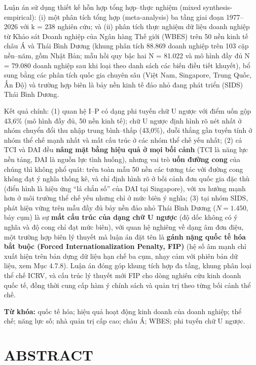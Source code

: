 \documentclass[
  a4paper,
  13pt]{extreport}
\begin{document}
Luận án sử dụng thiết kế hỗn hợp tổng hợp--thực nghiệm (mixed
synthesis-empirical): (i) một phân tích tổng hợp (meta-analysis) ba tầng
giai đoạn 1977--2026 với k = 238 nghiên cứu; và (ii) phân tích thực
nghiệm dữ liệu doanh nghiệp từ Khảo sát Doanh nghiệp của Ngân hàng Thế
giới (WBES) trên 50 nền kinh tế châu Á và Thái Bình Dương (khung phân
tích 88.869 doanh nghiệp trên 103 cặp nền--năm, gồm Nhật Bản; mẫu hồi
quy bậc hai N = 81.022 và mô hình đầy đủ N = 79.080 doanh nghiệp sau khi
loại theo danh sách các biến điều tiết khuyết), bổ sung bằng các phân
tích quốc gia chuyên sâu (Việt Nam, Singapore, Trung Quốc, Ấn Độ) và
trường hợp biên là bảy nền kinh tế đảo nhỏ đang phát triển (SIDS) Thái
Bình Dương.

Kết quả chính: (1) quan hệ I--P có dạng phi tuyến chữ U ngược với điểm
uốn gộp 43,6\% (mô hình đầy đủ, 50 nền kinh tế); chữ U ngược định hình
rõ nét nhất ở nhóm chuyển đổi thu nhập trung bình--thấp (43,0\%), duỗi
thẳng gần tuyến tính ở nhóm thể chế mạnh nhất và mất cấu trúc ở các nhóm
thể chế yếu nhất; (2) cả TCI và DAI đều \textbf{nâng mặt bằng hiệu quả ở
mọi bối cảnh} (TCI là năng lực nền tảng, DAI là nguồn lực tình huống),
nhưng vai trò \textbf{uốn đường cong} của chúng thì không phổ quát: trên
toàn mẫu 50 nền các tương tác với đường cong không đạt ý nghĩa thống kê,
và chỉ định hình rõ ở bối cảnh đơn quốc gia đặc thù (điển hình là hiệu
ứng ``lá chắn số'' của DAI tại Singapore), với xu hướng mạnh hơn ở môi
trường thể chế yếu nhưng chỉ ở mức biên ý nghĩa; (3) tại nhóm SIDS, phát
hiện vững trên mẫu đầy đủ bảy nền đảo nhỏ Thái Bình Dương
(\(N = 1.450\), bảy cụm) là sự \textbf{mất cấu trúc của dạng chữ U
ngược} (độ dốc không có ý nghĩa và độ cong chỉ đạt mức biên), với quan
hệ nghiêng về dạng âm đơn điệu, một trường hợp biên lý thuyết mà luận án
đặt tên là \textbf{gánh nặng quốc tế hóa bắt buộc (Forced
Internationalization Penalty, FIP)} (hệ số âm mạnh chỉ xuất hiện trên
bản dựng dữ liệu hạn chế ba cụm, nhạy cảm với phiên bản dữ liệu, xem Mục
4.7.8). Luận án đóng góp khung tích hợp đa tầng, khung phân loại thể chế
ICRV, và cấu trúc lý thuyết mới FIP cho dòng nghiên cứu kinh doanh quốc
tế, đồng thời cung cấp hàm ý chính sách và quản trị theo từng bối cảnh
thể chế.

\textbf{Từ khóa:} quốc tế hóa; hiệu quả hoạt động kinh doanh của doanh
nghiệp; thể chế; năng lực số; nhà quản trị cấp cao; châu Á; WBES; phi
tuyến chữ U ngược.

\newpage

\hypertarget{abstract}{%
\section*{ABSTRACT}\label{abstract}}
\end{document}
